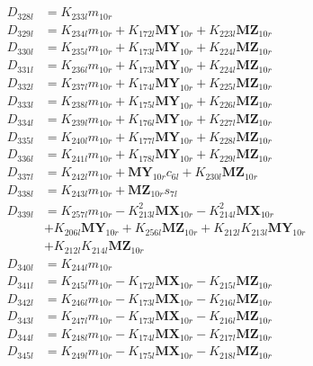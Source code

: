\begin{align}
 \nonumber \\ 
D_{328l} &= K_{233l}m_{10r} \nonumber \\
D_{329l} &= K_{234l}m_{10r} + K_{172l}\mathbf{MY}_{10r} + K_{223l}\mathbf{MZ}_{10r} \nonumber \\
D_{330l} &= K_{235l}m_{10r} + K_{173l}\mathbf{MY}_{10r} + K_{224l}\mathbf{MZ}_{10r} \nonumber \\
D_{331l} &= K_{236l}m_{10r} + K_{173l}\mathbf{MY}_{10r} + K_{224l}\mathbf{MZ}_{10r} \nonumber \\
D_{332l} &= K_{237l}m_{10r} + K_{174l}\mathbf{MY}_{10r} + K_{225l}\mathbf{MZ}_{10r} \nonumber \\
D_{333l} &= K_{238l}m_{10r} + K_{175l}\mathbf{MY}_{10r} + K_{226l}\mathbf{MZ}_{10r} \nonumber \\
D_{334l} &= K_{239l}m_{10r} + K_{176l}\mathbf{MY}_{10r} + K_{227l}\mathbf{MZ}_{10r} \nonumber \\
D_{335l} &= K_{240l}m_{10r} + K_{177l}\mathbf{MY}_{10r} + K_{228l}\mathbf{MZ}_{10r} \nonumber \\
D_{336l} &= K_{241l}m_{10r} + K_{178l}\mathbf{MY}_{10r} + K_{229l}\mathbf{MZ}_{10r} \nonumber \\
D_{337l} &= K_{242l}m_{10r} + \mathbf{MY}_{10r}c_{6l} + K_{230l}\mathbf{MZ}_{10r} \nonumber \\
D_{338l} &= K_{243l}m_{10r} + \mathbf{MZ}_{10r}s_{7l} \nonumber \\
D_{339l} &= K_{257l}m_{10r} - K_{213l}^2\mathbf{MX}_{10r} - K_{214l}^2\mathbf{MX}_{10r}  \nonumber \\
&+ K_{206l}\mathbf{MY}_{10r} + K_{256l}\mathbf{MZ}_{10r} + K_{212l}K_{213l}\mathbf{MY}_{10r}  \nonumber \\
&+ K_{212l}K_{214l}\mathbf{MZ}_{10r} \nonumber \\
D_{340l} &= K_{244l}m_{10r} \nonumber \\
D_{341l} &= K_{245l}m_{10r} - K_{172l}\mathbf{MX}_{10r} - K_{215l}\mathbf{MZ}_{10r} \nonumber \\
D_{342l} &= K_{246l}m_{10r} - K_{173l}\mathbf{MX}_{10r} - K_{216l}\mathbf{MZ}_{10r} \nonumber \\
D_{343l} &= K_{247l}m_{10r} - K_{173l}\mathbf{MX}_{10r} - K_{216l}\mathbf{MZ}_{10r} \nonumber \\
D_{344l} &= K_{248l}m_{10r} - K_{174l}\mathbf{MX}_{10r} - K_{217l}\mathbf{MZ}_{10r} \nonumber \\
D_{345l} &= K_{249l}m_{10r} - K_{175l}\mathbf{MX}_{10r} - K_{218l}\mathbf{MZ}_{10r} \nonumber \\

\end{align}
